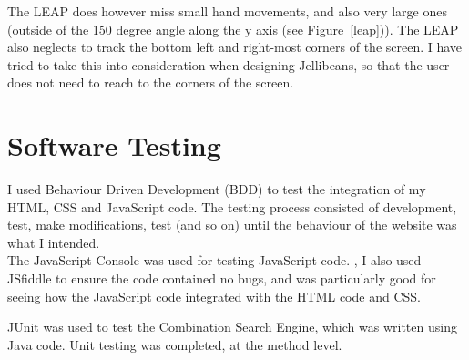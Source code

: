 \documentclass[a4paper, 11pt]{article}
\begin{document}
\vspace{5mm}
The LEAP does however miss small hand movements, and also very large ones (outside of the 150 degree angle along the y axis (see Figure~\ref{leap})). The LEAP also neglects to track the bottom left and right-most corners of the screen. I have tried to take this into consideration when designing Jellibeans, so that the user does not need to reach to the corners of the screen.

\section{Software Testing}

I used Behaviour Driven Development (BDD) to test the integration of my HTML, CSS and JavaScript code. The testing process consisted of development, test, make modifications, test (and so on) until the behaviour of the website was what I intended.\\

\vspace{5mm}
The JavaScript Console was used for testing JavaScript code. \cite{javascripttesting}, I also used JSfiddle \cite{jsfiddle} to ensure the code contained no bugs, and was particularly good for seeing how the JavaScript code integrated with the HTML code and CSS.

\vspace{5mm}
JUnit was used to test the Combination Search Engine, which was written using Java code. Unit testing was completed, at the method level.

\end{document}
